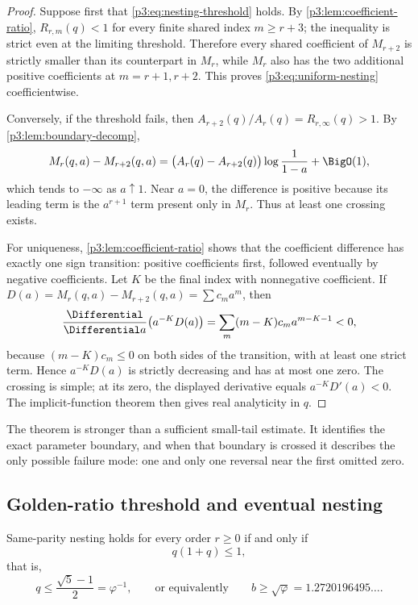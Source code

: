 \documentclass[11pt]{article}
\numberwithin{equation}{section}
\theoremstyle{definition}
\theoremstyle{remark}
\begin{document}
\begin{proof}
Suppose first that \eqref{p3:eq:nesting-threshold} holds.  By
\cref{p3:lem:coefficient-ratio}, $R_{r,m}(q)<1$ for every finite shared index
$m\ge r+3$; the inequality is strict even at the limiting threshold.  Therefore every shared
coefficient of $M_{r+2}$ is strictly smaller than its counterpart in $M_r$, while $M_r$ also
has the two additional positive coefficients at $m=r+1,r+2$.  This proves
\eqref{p3:eq:uniform-nesting} coefficientwise.

Conversely, if the threshold fails, then $A_{r+2}(q)/A_r(q)=R_{r,\infty}(q)>1$.
By \cref{p3:lem:boundary-decomp},
\[
 M_r(q,a)-M_{r+2}(q,a)
 =\bigl(A_r(q)-A_{r+2}(q)\bigr)\log\frac1{1-a}+\BigO(1),
\]
which tends to $-\infty$ as $a\uparrow1$.  Near $a=0$, the difference is positive because
its leading term is the $a^{r+1}$ term present only in $M_r$.  Thus at least one crossing
exists.

For uniqueness, \cref{p3:lem:coefficient-ratio} shows that the coefficient difference has
exactly one sign transition: positive coefficients first, followed eventually by negative
coefficients.  Let $K$ be the final index with nonnegative coefficient.  If
$D(a)=M_r(q,a)-M_{r+2}(q,a)=\sum c_ma^m$, then
\[
 \frac{\Differential}{\Differential a}\bigl(a^{-K}D(a)\bigr)
 =\sum_m(m-K)c_ma^{m-K-1}<0,
 \]
because $(m-K)c_m\le0$ on both sides of the transition, with at least one strict term.
Hence $a^{-K}D(a)$ is strictly decreasing and has at most one zero.  The crossing is simple;
at its zero, the displayed derivative equals $a^{-K}D'(a)<0$.  The implicit-function theorem
then gives real analyticity in $q$.
\end{proof}

\begin{remark}
The theorem is stronger than a sufficient small-tail estimate.  It identifies the exact
parameter boundary, and when that boundary is crossed it describes the only possible
failure mode: one and only one reversal near the first omitted zero.
\end{remark}

\subsection{Golden-ratio threshold and eventual nesting}

\begin{corollary}\label{p3:cor:golden-threshold}
Same-parity nesting holds for every order $r\ge0$ if and only if
\begin{equation}
 q(1+q)\le1,
 \end{equation}
that is,
\begin{equation}
 q\le\frac{\sqrt5-1}{2}=\varphi^{-1},
 \qquad\text{or equivalently}\qquad
 b\ge\sqrt\varphi=1.2720196495\ldots.
 \label{p3:eq:golden-base}
\end{equation}
\end{corollary}
\end{document}

